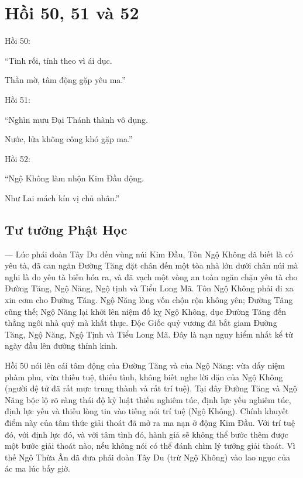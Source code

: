 \chapter{Hồi 50, 51 và 52} %
\label{cha:hoi_50_51}

Hồi 50:

\begin{itshape}
``Tình rối, tính theo vì ái dục.

Thần mờ, tâm động gặp yêu ma.''
\end{itshape}

Hồi 51:

\begin{itshape}
``Nghìn mưu Đại Thánh thành vô dụng.

Nước, lửa không công khó gặp ma.''
\end{itshape}

Hồi 52:

\begin{itshape}
``Ngộ Không làm nhộn Kim Đầu động.

Như Lai mách kín vị chủ nhân.''
\end{itshape}

\section{Tư tưởng Phật Học} %
\label{sec:50_51_phat_hoc}

— Lúc phái đoàn Tây Du đến vùng núi Kim Đầu, Tôn Ngộ Không đã biết là có yêu tà, đã can ngăn Đường Tăng đặt chân đến một tòa nhà lớn dưới chân núi mà nghi là do yêu tà biến hóa ra, và đã vạch một vòng an toàn ngăn chặn yêu tà cho Đường Tăng, Ngộ Năng, Ngộ tịnh và Tiểu Long Mã. Tôn Ngộ Không phải đi xa xin cơm cho Đường Tăng. Ngộ Năng lòng vốn chộn rộn không yên; Đường Tăng cũng thế; Ngộ Năng lại khởi lên niệm đố kỵ Ngộ Không, dục Đường Tăng đến thẳng ngôi nhà quỷ mà khất thực. Độc Giốc quỷ vương đã bắt giam Đường Tăng, Ngộ Năng, Ngộ Tịnh và Tiểu Long Mã. Đây là nạn nguy hiểm nhất kể từ ngày đầu lên đường thỉnh kinh.

Hồi 50 nói lên cái tâm động của Đường Tăng và của Ngộ Năng: vừa dấy niệm phàm phu, vừa thiếu tuệ, thiếu tình, không biết nghe lời dặn của Ngộ Không (người đệ tử đã rất mực trung thành và rất trí tuệ). Tại đây Đường Tăng và Ngộ Năng bộc lộ rõ ràng thái độ kỷ luật thiếu nghiêm túc, định lực yếu nghiêm túc, định lực yếu và thiếu lòng tin vào tiếng nói trí tuệ (Ngộ Không). Chính khuyết điểm này của tâm thức giải thoát đã mở ra ma nạn ở động Kim Đầu. Với trí tuệ đó, với định lực đó, và với tâm tình đó, hành giả sẽ không thể bước thêm được một bước giải thoát nào, nếu không nói có thể đánh chìm lý tưởng giải thoát. Vì thế Ngô Thừa Ân đã đưa phái đoàn Tây Du (trừ Ngộ Không) vào lao ngục của ác ma lúc bấy giờ.

